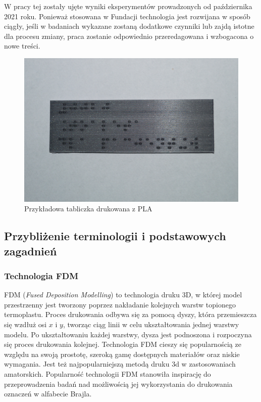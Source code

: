 \documentclass[12pt,a4paper]{article}
\begin{document}
W pracy tej zostały ujęte wyniki eksperymentów prowadzonych od października 2021 roku. Ponieważ stosowana w Fundacji technologia jest rozwijana w sposób ciągły, jeśli w badaniach wykazane zostaną dodatkowe czynniki lub zajdą istotne dla procesu zmiany, praca zostanie odpowiednio przeredagowana i wzbogacona o nowe treści.

\begin{figure}
\includegraphics[width=\linewidth]{sgn_pla.jpg}
\caption{Przykładowa tabliczka drukowana z PLA}
\end{figure}

\subsection{Przybliżenie terminologii i podstawowych zagadnień}
\subsubsection{Technologia FDM}
FDM (\emph{Fused Deposition Modelling}) to technologia druku 3D, w której model przestrzenny jest tworzony poprzez nakładanie kolejnych warstw topionego termoplastu. Proces drukowania odbywa się za pomocą dyszy, która przemieszcza się wzdłuż osi $x$ i $y$, tworząc ciąg linii w celu ukształtowania jednej warstwy modelu. Po ukształtowaniu każdej warstwy, dysza jest podnoszona i rozpoczyna się proces drukowania kolejnej. Technologia FDM cieszy się popularnością ze względu na swoją prostotę, szeroką gamę dostępnych materiałów oraz niskie wymagania. Jest też najpopularniejszą metodą druku 3d w zastosowaniach amatorskich.
Popularność technologii FDM stanowiła inspirację do przeprowadzenia badań nad możliwością jej wykorzystania do drukowania oznaczeń w alfabecie Brajla.
\end{document}
